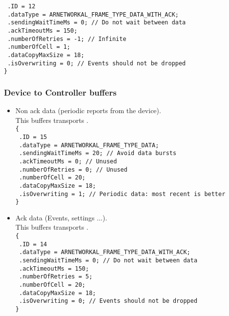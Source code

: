\begin{itemize}
{    \texttt{  .ID = 12}\\
    \texttt{  .dataType = ARNETWORKAL\_FRAME\_TYPE\_DATA\_WITH\_ACK;}\\
    \texttt{  .sendingWaitTimeMs = 0; // Do not wait between data}\\
    \texttt{  .ackTimeoutMs = 150;}\\
    \texttt{  .numberOfRetries = -1; // Infinite}\\
    \texttt{  .numberOfCell = 1;}\\
    \texttt{  .dataCopyMaxSize = 18;}\\
    \texttt{  .isOverwriting = 0; // Events should not be dropped}\\
    \texttt{\}}
}
\end{itemize}


\subsubsection*{Device to Controller buffers}
\begin{itemize}
\item{
    Non ack data (periodic reports from the device).\\
    This buffers transports .\\
    \texttt{\{}\\
    \texttt{  .ID = 15}\\
    \texttt{  .dataType = ARNETWORKAL\_FRAME\_TYPE\_DATA;}\\
    \texttt{  .sendingWaitTimeMs = 20; // Avoid data bursts}\\
    \texttt{  .ackTimeoutMs = 0; // Unused}\\
    \texttt{  .numberOfRetries = 0; // Unused}\\
    \texttt{  .numberOfCell = 20;}\\
    \texttt{  .dataCopyMaxSize = 18;}\\
    \texttt{  .isOverwriting = 1; // Periodic data: most recent is better}\\
    \texttt{\}}
}
\item{
    Ack data (Events, settings ...).\\
    This buffers transports .\\
    \texttt{\{}\\
    \texttt{  .ID = 14}\\
    \texttt{  .dataType = ARNETWORKAL\_FRAME\_TYPE\_DATA\_WITH\_ACK;}\\
    \texttt{  .sendingWaitTimeMs = 0; // Do not wait between data}\\
    \texttt{  .ackTimeoutMs = 150;}\\
    \texttt{  .numberOfRetries = 5;}\\
    \texttt{  .numberOfCell = 20;}\\
    \texttt{  .dataCopyMaxSize = 18;}\\
    \texttt{  .isOverwriting = 0; // Events should not be dropped}\\
    \texttt{\}}
}
\end{itemize}


